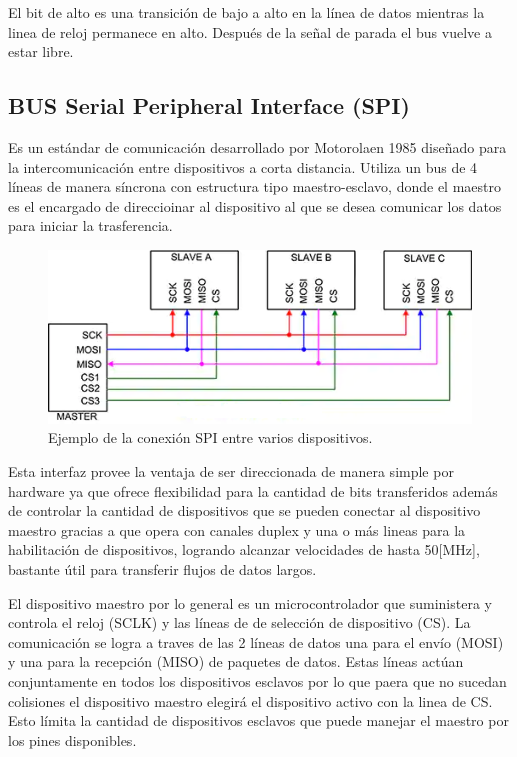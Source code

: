 \documentclass[letterpaper,12pt,oneside]{book}
\begin{document}
			El bit de alto es una transición de bajo a alto en la línea de datos mientras la linea de reloj permanece en alto. Después de la señal de parada el bus vuelve a estar libre.



			\subsection{BUS Serial Peripheral Interface (SPI)}
			Es un estándar de comunicación desarrollado por Motorolaen 1985 diseñado para la intercomunicación entre dispositivos a corta distancia. Utiliza un bus de 4 líneas de manera síncrona con estructura tipo maestro-esclavo, donde el maestro es el encargado de direccioinar al dispositivo al que se desea comunicar los datos para iniciar la trasferencia.

			\begin{figure}[!htpb]
				\centering
				\includegraphics[scale = 0.8]{Material de Consulta/ConectionSPI.PNG}
				\caption[Conexión SPI entre dispositivos]{Ejemplo de la conexión SPI entre varios dispositivos.}
				\label{SPIConEx}
			\end{figure}

			Esta interfaz provee la ventaja de ser direccionada de manera simple por hardware ya que ofrece flexibilidad para la cantidad de bits transferidos además de controlar la cantidad de dispositivos que se pueden conectar al dispositivo maestro gracias a que opera con canales duplex y una o más lineas para la habilitación de dispositivos, logrando alcanzar velocidades de hasta 50[MHz], bastante útil para transferir flujos de datos largos.

			El dispositivo maestro por lo general es un microcontrolador que suministera y controla el reloj (SCLK) y las líneas de de selección de dispositivo (CS). La comunicación se logra a traves de las 2 líneas de datos una para el envío (MOSI) y una para la recepción (MISO) de paquetes de datos. Estas líneas actúan conjuntamente en todos los dispositivos esclavos por lo que paera que no sucedan colisiones el dispositivo maestro elegirá el dispositivo activo con la linea de CS. Esto límita la cantidad de dispositivos esclavos que puede manejar el maestro por los pines disponibles.
\end{document}
